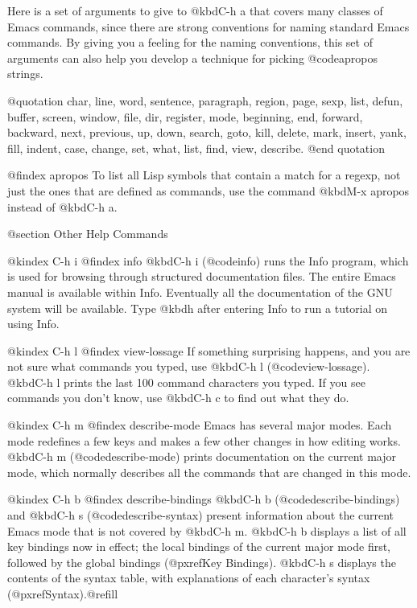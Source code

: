 {{  Here is a set of arguments to give to @kbd{C-h a} that covers many
classes of Emacs commands, since there are strong conventions for naming
standard Emacs commands.  By giving you a feeling for the naming
conventions, this set of arguments can also help you develop a
technique for picking @code{apropos} strings.

@quotation
char, line, word, sentence, paragraph, region, page, sexp, list, defun,
buffer, screen, window, file, dir, register, mode,
beginning, end, forward, backward, next, previous, up, down, search, goto,
kill, delete, mark, insert, yank, fill, indent, case,
change, set, what, list, find, view, describe.
@end quotation

@findex apropos
  To list all Lisp symbols that contain a match for a regexp, not just
the ones that are defined as commands, use the command @kbd{M-x apropos}
instead of @kbd{C-h a}.

@section Other Help Commands

@kindex C-h i
@findex info
  @kbd{C-h i} (@code{info}) runs the Info program, which is used for
browsing through structured documentation files.  The entire Emacs manual
is available within Info.  Eventually all the documentation of the GNU
system will be available.  Type @kbd{h} after entering Info to run
a tutorial on using Info.

@kindex C-h l
@findex view-lossage
  If something surprising happens, and you are not sure what commands you
typed, use @kbd{C-h l} (@code{view-lossage}).  @kbd{C-h l} prints the last
100 command characters you typed.  If you see commands you don't
know, use @kbd{C-h c} to find out what they do.

@kindex C-h m
@findex describe-mode
  Emacs has several major modes. Each mode redefines a few keys and
makes a few other changes in how editing works.  @kbd{C-h m}
(@code{describe-mode}) prints documentation on the current major mode,
which normally describes all the commands that are changed in this mode.

@kindex C-h b
@findex describe-bindings
  @kbd{C-h b} (@code{describe-bindings}) and @kbd{C-h s}
(@code{describe-syntax}) present information about the current Emacs
mode that is not covered by @kbd{C-h m}.  @kbd{C-h b} displays a list of
all key bindings now in effect; the local bindings of the current
major mode first, followed by the global bindings (@pxref{Key
Bindings}).  @kbd{C-h s} displays the contents of the syntax table, with
explanations of each character's syntax (@pxref{Syntax}).@refill

}}
